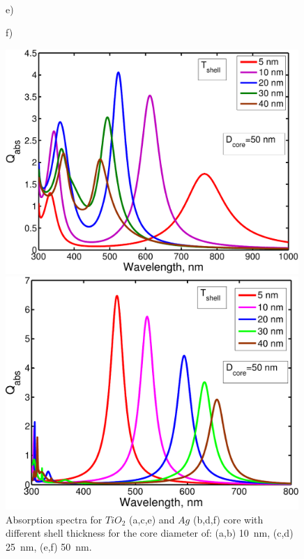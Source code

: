 \documentclass[aip,jap,reprint]{revtex4-1}
\begin{document}
\begin{figure}
\begin{minipage}[h]{0.235\textwidth}
  \end{minipage}\\
  \vspace{4pt}
  \begin{minipage}[h]{0.235\textwidth}
    \begin{flushleft}
      e)
    \end{flushleft}
  \end{minipage}
  \hfill
  \begin{minipage}[h]{0.235\textwidth}
    \begin{flushleft}
      f)
    \end{flushleft}
  \end{minipage}
  \begin{minipage}[h]{0.235\textwidth}
    \includegraphics[width=0.99\textwidth]{Qabs_core_50nm}
  \end{minipage}
  \hfill
  \begin{minipage}[h]{0.235\textwidth}
    \includegraphics[width=0.99\textwidth]{Qabs_Ag_TiO_50_t}
  \end{minipage}%
  \caption{Absorption spectra for $TiO_2$ (a,c,e) and $Ag$ (b,d,f)
    core with different shell thickness for the core diameter of: (a,b)
    10~nm, (c,d) 25~nm, (e,f) 50~nm.
    \label{fig:spectra}}%
\end{figure}
\end{document}
